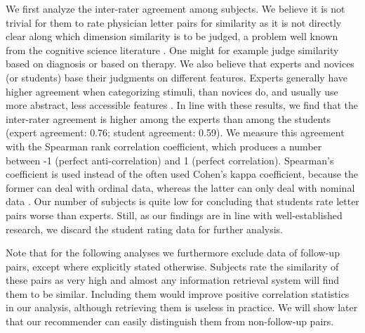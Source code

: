 We first analyze the inter-rater agreement among subjects. We believe it is not trivial for them to rate physician letter pairs for similarity as it is not directly clear along which dimension similarity is to be judged, a problem well known from the cognitive science literature \citep{Medin1993}. One might for example judge similarity based on diagnosis or based on therapy. We also believe that experts and novices (or students) base their judgments on different features. Experts generally have higher agreement when categorizing stimuli, than novices do, and usually use more abstract, less accessible features \citep{Chi1981, Linhares2007, Leon-Villagra2013}. In line with these results, we find that the inter-rater agreement is higher among the experts than among the students (expert agreement: 0.76; student agreement: 0.59). We measure this agreement with the Spearman rank correlation coefficient, which produces a number between -1 (perfect anti-correlation) and 1 (perfect correlation). Spearman's coefficient is used instead of the often used Cohen's kappa coefficient, because the former can deal with ordinal data, whereas the latter can only deal with nominal data \citep{Spearman1904, Cohen1960}. Our number of subjects is quite low for concluding that students rate letter pairs worse than experts. Still, as our findings are in line with well-established research, we discard the student rating data for further analysis. 

Note that for the following analyses we furthermore exclude data of follow-up pairs, except where explicitly stated otherwise. Subjects rate the similarity of these pairs as very high and almost any information retrieval system will find them to be similar. Including them would improve positive correlation statistics in our analysis, although retrieving them is useless in practice. We will show later that our recommender can easily distinguish them from non-follow-up pairs.

